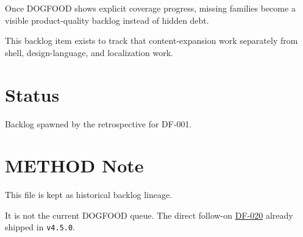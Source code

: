 Once DOGFOOD shows explicit coverage progress, missing families become a visible product-quality backlog instead of hidden debt.

This backlog item exists to track that content-expansion work separately from shell, design-language, and localization work.

\section{Status}\label{record-293-status}

Backlog spawned by the retrospective for DF-001.

\section{METHOD Note}\label{record-293-method-note}

This file is kept as historical backlog lineage.

It is not the current DOGFOOD queue. The direct follow-on \href{https://github.com/flyingrobots/bijou/blob/cbd70612140e7a450d764b3c7be1c6af878b99bc/docs/method/retro/DF-020-deepen-dogfood-story-depth-and-variant-quality.md}{DF-020} already shipped in \texttt{v\allowbreak{}4\allowbreak{}.\allowbreak{}5\allowbreak{}.\allowbreak{}0}.

